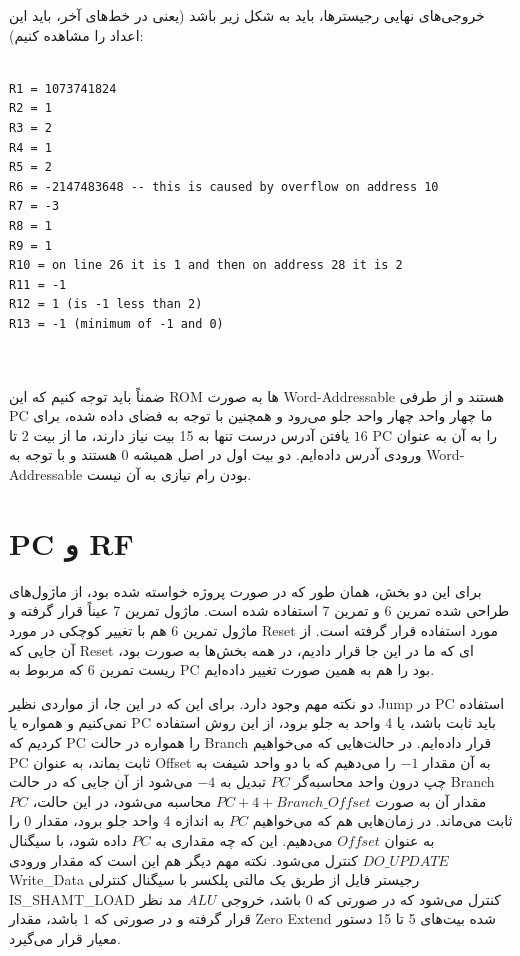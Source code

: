 \documentclass[12pt,titlepage,a4page , tikz , multi,table , svgnames,xcdraw]{article}
\begin{document}
خروجی‌های نهایی رجیسترها، باید به شکل زیر باشد (یعنی در خط‌های آخر، باید این اعداد را مشاهده کنیم):


\begin{latin}

\begin{verbatim}

R1 = 1073741824
R2 = 1
R3 = 2
R4 = 1
R5 = 2
R6 = -2147483648 -- this is caused by overflow on address 10
R7 = -3
R8 = 1
R9 = 1
R10 = on line 26 it is 1 and then on address 28 it is 2
R11 = -1
R12 = 1 (is -1 less than 2)
R13 = -1 (minimum of -1 and 0)



\end{verbatim}


\end{latin}

ضمناً باید توجه کنیم که این ROM ها به صورت Word-Addressable هستند و از طرفی PC ما چهار واحد چهار واحد جلو می‌رود و همچنین با توجه به فضای داده شده، برای یافتن آدرس درست تنها به 15 بیت نیاز دارند، ما از بیت $2$ تا $16$ PC را به آن به عنوان ورودی آدرس داده‌ایم. دو بیت اول در اصل همیشه $0$ هستند و با توجه به Word-Addressable بودن رام نیازی به آن نیست.



\section{PC و RF}

برای این دو بخش، همان طور که در صورت پروژه خواسته شده بود، از ماژول‌های طراحی شده تمرین 6 و تمرین 7 استفاده شده است. ماژول تمرین 7 عیناً قرار گرفته و ماژول تمرین 6 هم با تغییر کوچکی در مورد Reset مورد استفاده قرار گرفته است. از آن جایی که Reset ای که ما در این جا قرار دادیم، در همه بخش‌ها به صورت  بود، ریست تمرین 6 که مربوط به PC بود را هم به همین صورت تغییر داده‌ایم.

دو نکته مهم وجود دارد. برای این که در این جا، از مواردی نظیر Jump در PC استفاده نمی‌کنیم و همواره یا PC باید ثابت باشد، یا 4 واحد به جلو برود، از این روش استفاده کردیم که PC را همواره در حالت Branch قرار داده‌ایم. در حالت‌هایی که می‌خواهیم PC ثابت بماند، به عنوان Offset به آن مقدار $-1$ را می‌دهیم که با دو واحد شیفت به چپ درون واحد محاسبه‌گر $PC$ تبدیل به $-4$ می‌شود از آن جایی که در حالت Branch مقدار آن به صورت $PC + 4 + Branch\_Offset$ محاسبه می‌شود، در این حالت، $PC$ ثابت می‌ماند. در زمان‌هایی هم که می‌خواهیم $PC$ به اندازه 4 واحد جلو برود، مقدار $0$ را به عنوان $Offset$ می‌دهیم. این که چه مقداری به $PC$ داده شود، با سیگنال $DO\_UPDATE$ کنترل می‌شود. نکته مهم دیگر هم این است که مقدار ورودی Write\_Data رجیستر فایل از طریق یک مالتی پلکسر با سیگنال کنترلی IS\_SHAMT\_LOAD کنترل می‌شود که در صورتی که $0$ باشد، خروجی $ALU$ مد نظر قرار گرفته و در صورتی که $1$ باشد، مقدار Zero Extend شده بیت‌های 5 تا 15 دستور معیار قرار می‌گیرد.
\end{document}
